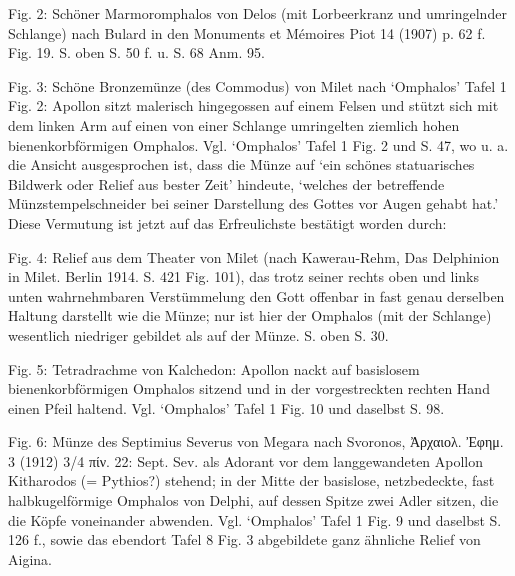 \documentclass[a4paper, 11pt, oneside]{article}
\begin{document}
Fig. 2: Schöner Marmoromphalos von Delos (mit Lorbeerkranz und umringelnder Schlange) nach Bulard in den Monuments et Mémoires Piot 14 (1907) p. 62 f. Fig. 19. S. oben S. 50 f. u. S. 68 Anm. 95.

Fig. 3: Schöne Bronzemünze (des Commodus) von Milet nach `Omphalos' Tafel 1 Fig. 2: Apollon sitzt malerisch hingegossen auf einem Felsen und stützt sich mit dem linken Arm auf einen von einer Schlange umringelten ziemlich hohen bienenkorbförmigen Omphalos. Vgl. `Omphalos' Tafel 1 Fig. 2 und S. 47, wo u. a. die Ansicht ausgesprochen ist, dass die Münze auf `ein schönes statuarisches Bildwerk oder Relief aus bester Zeit' hindeute, `welches der betreffende Münzstempelschneider bei seiner Darstellung des Gottes vor Augen gehabt hat.' Diese Vermutung ist jetzt auf das Erfreulichste bestätigt worden durch:

Fig. 4: Relief aus dem Theater von Milet (nach Kawerau-Rehm, Das Delphinion in Milet. Berlin 1914. S. 421 Fig. 101), das trotz seiner rechts oben und links unten wahrnehmbaren Verstümmelung den Gott offenbar in fast genau derselben Haltung darstellt wie die Münze; nur ist hier der Omphalos (mit der Schlange) wesentlich niedriger gebildet als auf der Münze. S. oben S. 30.

Fig. 5: Tetradrachme von Kalchedon: Apollon nackt auf basislosem bienenkorbförmigen Omphalos sitzend und in der vorgestreckten rechten Hand einen Pfeil haltend. Vgl. `Omphalos' Tafel 1 Fig. 10 und daselbst S. 98.

Fig. 6: Münze des Septimius Severus von Megara nach Svoronos, Ἀρχαιολ. Ἐφημ. 3 (1912) 3/4 πίν. 22: Sept. Sev. als Adorant vor dem langgewandeten Apollon Kitharodos (= Pythios?) stehend; in der Mitte der basislose, netzbedeckte, fast halbkugelförmige Omphalos von Delphi, auf dessen Spitze zwei Adler sitzen, die die Köpfe voneinander abwenden. Vgl. `Omphalos' Tafel 1 Fig. 9 und daselbst S. 126 f., sowie das ebendort Tafel 8 Fig. 3 abgebildete ganz ähnliche Relief von Aigina.
\end{document}
